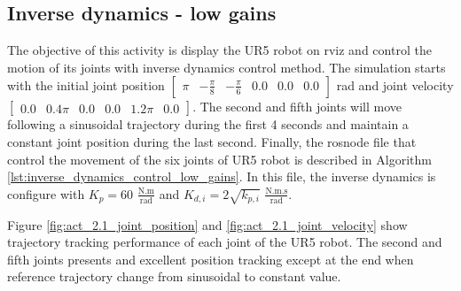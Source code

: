 
\subsection{Inverse dynamics - low gains}
The objective of this activity is display the UR5 robot on rviz and control the motion of its joints with inverse dynamics control method. The simulation starts with the initial joint position $\begin{bmatrix} \pi & -\frac{\pi}{8} & -\frac{\pi}{6} & 0.0 & 0.0 & 0.0 \end{bmatrix}$ rad and joint velocity $\begin{bmatrix} 0.0 & 0.4\pi & 0.0 & 0.0 & 1.2\pi & 0.0 \end{bmatrix}$. The second and fifth joints will move following a sinusoidal trajectory during the first 4 seconds and maintain a constant joint position during the last second. Finally, the rosnode file that control the movement of the six joints of UR5 robot is described in Algorithm \ref{lst:inverse_dynamics_control_low_gains}. In this file, the inverse dynamics is configure with $K_p=60$ $\mathrm{\frac{N.m}{rad}}$ and $K_{d,i}=2\sqrt{k_{p,i}}$ $\mathrm{\frac{N.m.s}{rad}}$. 

Figure \ref{fig:act_2.1_joint_position} and \ref{fig:act_2.1_joint_velocity} show trajectory tracking performance of each joint of the UR5 robot. The second and fifth joints presents and excellent position tracking except at the end when reference trajectory change from sinusoidal to constant value. \vspace{5px}


